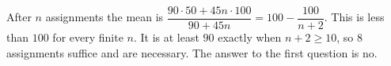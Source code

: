 After $n$ assignments the mean is $\dfrac{90\cdot50+45n\cdot100}{90+45n}=100-\dfrac{100}{n+2}$. This is less than $100$ for every finite $n$. It is at least $90$ exactly when $n+2\ge10$, so $\boxed8$ assignments suffice and are necessary. The answer to the first question is $\boxed{\text{no}}$.
